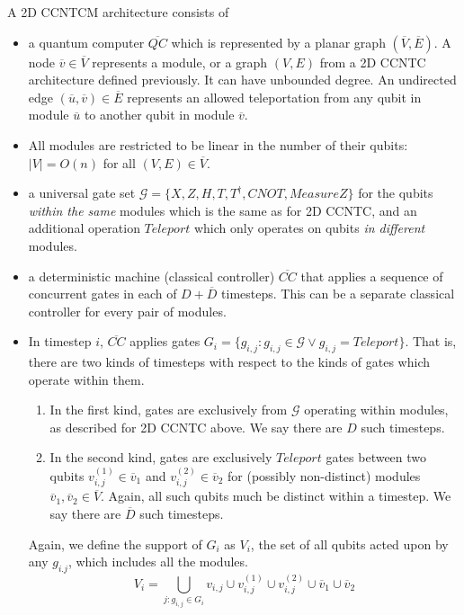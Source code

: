 \begin{definition}
A \textsc{2D CCNTCM} architecture consists of

\begin{itemize}
\item a quantum computer $\overline{QC}$ which is represented by a planar graph $(\overline{V},\overline{E})$. A
node $\overline{v} \in \overline{V}$ represents a module, or a graph $(V,E)$
from a \textsc{2D CCNTC} architecture defined previously. It can have
unbounded degree.
An
undirected edge $(\overline{u},\overline{v}) \in \overline{E}$ represents an
allowed teleportation from any qubit in module $\overline{u}$ to
another qubit in module $\overline{v}$.
\item All modules are restricted to be linear in the number of their qubits:
$|V| = O(n)$ for all $(V,E) \in \overline{V}$.
\item a universal gate set $\mathcal{G} = \{X, Z, H, T, T^{\dagger}, CNOT,
MeasureZ\}$
for the qubits \emph{within the same} modules which is the same as for \textsc{2D CCNTC},
and an additional operation $Teleport$ which only operates on qubits
\emph{in
different} modules.
\item a deterministic machine (classical controller) $\overline{CC}$ that applies a sequence
of concurrent gates in each of $D+\overline{D}$ timesteps.
This can be a separate classical controller
for every pair of modules.
\item In timestep $i$, $\overline{CC}$ applies
gates $G_i = \{g_{i,j} : g_{i,j} \in \mathcal{G} \lor g_{i,j} = Teleport \}$.
That is, there are two kinds of timesteps with respect to the kinds of gates
which operate within them.
\begin{enumerate}
\item In the first kind, gates are exclusively from $\mathcal{G}$ operating within modules, as described
for \textsc{2D CCNTC} above. We say there are $D$ such timesteps.
\item In the second kind, gates are exclusively $Teleport$ gates between two qubits $v^{(1)}_{i,j} \in \overline{v}_1$ and
$v^{(2)}_{i,j} \in \overline{v}_2$ for
(possibly non-distinct) modules $\overline{v}_1, \overline{v}_2 \in \overline{V}$.
Again, all such qubits much be distinct within a timestep.
We say there are $\overline{D}$ such timesteps.
\end{enumerate}

Again, we define the support of $G_i$
as $V_i$, the set of all qubits acted upon by any $g_{i.j}$, which
includes all the modules.
\begin{equation}
V_i = \bigcup_{j: g_{i,j} \in G_i} v_{i,j} \cup v^{(1)}_{i,j} \cup v^{(2)}_{i,j} \cup \overline{v}_1 \cup \overline{v}_2
\end{equation}

\end{itemize}
\end{definition}

